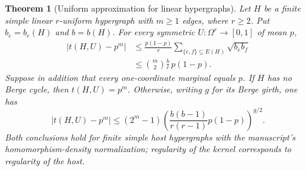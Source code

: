 \documentclass[a4paper,11pt,reqno]{amsart}
\theoremstyle{plain}
\newtheorem{theorem}{Theorem}[section]
\theoremstyle{definition}
\theoremstyle{remark}
\begin{document}
\begin{theorem}[Uniform approximation for linear hypergraphs]
\label{density-linear-approximation}
Let $H$ be a finite simple linear $r$-uniform hypergraph with
$m\ge1$ edges, where $r\ge2$.  Put $b_e=b_e(H)$ and $b=b(H)$.
For every symmetric $U:\Omega^r\to[0,1]$ of mean $p$,
\begin{align}
 |t(H,U)-p^m|
 &\le\frac{p(1-p)}r
       \sum_{\{e,f\}\subseteq E(H)}\sqrt{b_eb_f}
       \label{density-linear-general}\\
 &\le\binom m2\frac br\,p(1-p).
\end{align}
Suppose in addition that every one-coordinate marginal equals $p$.
If $H$ has no Berge cycle, then $t(H,U)=p^m$.  Otherwise, writing
$g$ for its Berge girth, one has
\begin{equation}\label{density-linear-regular}
 |t(H,U)-p^m|
 \le(2^m-1)
   \left(\frac{b(b-1)}{r(r-1)}p(1-p)\right)^{g/2}.
\end{equation}
Both conclusions hold for finite simple host hypergraphs with the
manuscript's homomorphism-density normalization; regularity of the
kernel corresponds to regularity of the host.
\end{theorem}
\end{document}
